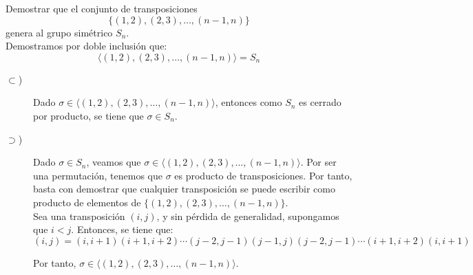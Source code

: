 \begin{ejercicio}\label{ej:2.21}
    Demostrar que el conjunto de transposiciones
    $$\{(1, 2), (2, 3), \ldots, (n - 1, n)\}$$
    genera al grupo simétrico $S_n$.\\
    Demostramos por doble inclusión que:
    \begin{equation*}
        \langle (1, 2), (2, 3), \ldots, (n - 1, n) \rangle = S_n
    \end{equation*}
    \begin{description}
        \item[$\subset$)] Dado $\sigma\in \langle (1, 2), (2, 3), \ldots, (n - 1, n) \rangle$, entonces como $S_n$ es cerrado por producto, se tiene que $\sigma\in S_n$.
        
        \item[$\supset$)] Dado $\sigma\in S_n$, veamos que $\sigma\in \langle (1, 2), (2, 3), \ldots, (n - 1, n) \rangle$. Por ser una permutación, tenemos que $\sigma$ es producto de transposiciones. Por tanto, basta con demostrar que cualquier transposición se puede escribir como producto de elementos de $\{(1, 2), (2, 3), \ldots, (n - 1, n)\}$.\\
        
        Sea una transposición $(i, j)$, y sin pérdida de generalidad, supongamos que $i<j$. Entonces, se tiene que:
        \begin{equation*}
            (i, j) = (i, i+1)(i+1, i+2)\cdots(j-2,j-1)(j-1, j)(j-2, j-1)\cdots(i+1, i+2)(i, i+1)
        \end{equation*}

        Por tanto, $\sigma\in \langle (1, 2), (2, 3), \ldots, (n - 1, n) \rangle$.
    \end{description}
\end{ejercicio}


